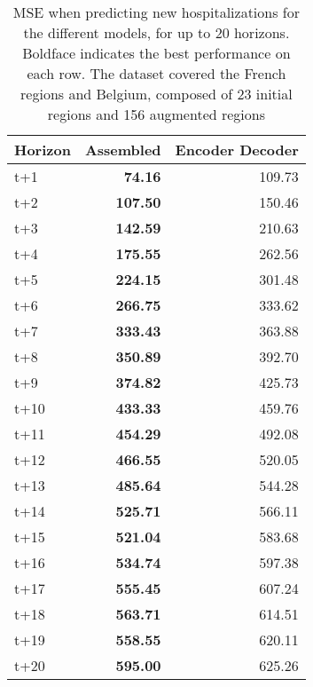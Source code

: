 \begin{table}[H]
\centering
\caption{MSE when predicting new hospitalizations for the different models, for up to 20 horizons. Boldface indicates the best performance on each row. The dataset covered the French regions and Belgium, composed of 23 initial regions and 156 augmented regions }
\label{tab:MSE_comparison}
\begin{tabular}{lrr}
\toprule
Horizon &  Assembled &  Encoder Decoder \\
\midrule
t+1  & \textbf{74.16}  & 109.73  \\
t+2  & \textbf{107.50}  & 150.46  \\
t+3  & \textbf{142.59}  & 210.63  \\
t+4  & \textbf{175.55}  & 262.56  \\
t+5  & \textbf{224.15}  & 301.48  \\
t+6  & \textbf{266.75}  & 333.62  \\
t+7  & \textbf{333.43}  & 363.88  \\
t+8  & \textbf{350.89}  & 392.70  \\
t+9  & \textbf{374.82}  & 425.73  \\
t+10  & \textbf{433.33}  & 459.76  \\
t+11  & \textbf{454.29}  & 492.08  \\
t+12  & \textbf{466.55}  & 520.05  \\
t+13  & \textbf{485.64}  & 544.28  \\
t+14  & \textbf{525.71}  & 566.11  \\
t+15  & \textbf{521.04}  & 583.68  \\
t+16  & \textbf{534.74}  & 597.38  \\
t+17  & \textbf{555.45}  & 607.24  \\
t+18  & \textbf{563.71}  & 614.51  \\
t+19  & \textbf{558.55}  & 620.11  \\
t+20  & \textbf{595.00}  & 625.26  \\

\bottomrule
\end{tabular}
\end{table}
